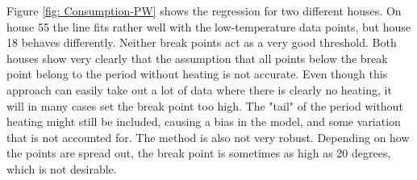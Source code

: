 \noindent Figure \ref{fig: Consumption-PW} shows the regression for two different houses. On house 55 the
line fits rather well with the low-temperature data points, but house 18 behaves differently. Neither break points act as a very good threshold. Both houses show very clearly that the assumption that all points below the break point belong to the period without heating is not accurate. Even though this approach can easily take out a lot of data
where there is clearly no heating, it will in many cases set the break point too high. The "tail" of the period without heating might still be included, causing a bias in the model, and some variation that is not accounted for. The method is also not very robust. Depending on how the points are spread out, the break point is sometimes as high as 20 degrees, which is not desirable.

